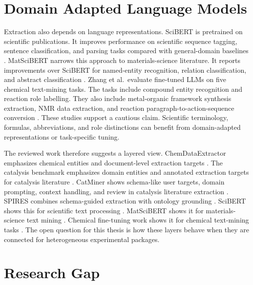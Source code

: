 \section{Domain Adapted Language Models}
\label{sec:domain-specific-models-retrieval-grounding}

Extraction also depends on language representations.
\ac{SciBERT} is pretrained on scientific publications.
It improves performance on scientific sequence tagging, sentence classification, and parsing tasks compared with general-domain baselines \cite{beltagy2019scibert}.
\ac{MatSciBERT} narrows this approach to materials-science literature.
It reports improvements over \ac{SciBERT} for named-entity recognition, relation classification, and abstract classification \cite{gupta2022matscibert}.
Zhang et al.\ evaluate fine-tuned \acp{LLM} on five chemical text-mining tasks.
The tasks include compound entity recognition and reaction role labelling.
They also include metal-organic framework synthesis extraction, \ac{NMR} data extraction, and reaction paragraph-to-action-sequence conversion \cite{zhang2024chemicaltextmining}.
These studies support a cautious claim.
Scientific terminology, formulas, abbreviations, and role distinctions can benefit from domain-adapted representations or task-specific tuning.

The reviewed work therefore suggests a layered view.
ChemDataExtractor emphasizes chemical entities and document-level extraction targets \cite{swain2016chemdataextractor}.
The catalysis benchmark emphasizes domain entities and annotated extraction targets for catalysis literature \cite{zhang2022knowledge}.
CatMiner shows schema-like user targets, domain prompting, context handling, and review in catalysis literature extraction \cite{walls2025catminer}.
\ac{SPIRES} combines schema-guided extraction with ontology grounding \cite{caufield2024spires}.
\ac{SciBERT} shows this for scientific text processing \cite{beltagy2019scibert}.
\ac{MatSciBERT} shows it for materials-science text mining \cite{gupta2022matscibert}.
Chemical fine-tuning work shows it for chemical text-mining tasks \cite{zhang2024chemicaltextmining}.
The open question for this thesis is how these layers behave when they are connected for heterogeneous experimental packages.

\section{Research Gap}
\label{sec:research-gap}

